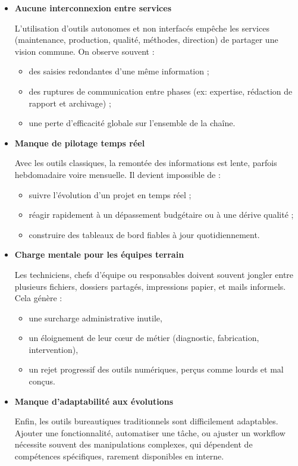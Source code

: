 \documentclass[11pt,a4paper]{article}
\begin{document}
\begin{itemize}
\item \textbf{Aucune interconnexion entre services}

L’utilisation d’outils autonomes et non interfacés empêche les services (maintenance, production, qualité, méthodes, direction) de partager une vision commune. On observe souvent :

\begin{itemize}
    \item des saisies redondantes d’une même information ;
    \item des ruptures de communication entre phases (ex: expertise, rédaction de rapport et archivage) ;
    \item une perte d’efficacité globale sur l’ensemble de la chaîne.
\end{itemize}

\item \textbf{Manque de pilotage temps réel}

Avec les outils classiques, la remontée des informations est lente, parfois hebdomadaire voire mensuelle. Il devient impossible de :

\begin{itemize}
    \item suivre l’évolution d’un projet en temps réel ;
    \item réagir rapidement à un dépassement budgétaire ou à une dérive qualité ;
    \item construire des tableaux de bord fiables à jour quotidiennement.
\end{itemize}

\item \textbf{Charge mentale pour les équipes terrain}

Les techniciens, chefs d’équipe ou responsables doivent souvent jongler entre plusieurs fichiers, dossiers partagés, impressions papier, et mails informels. Cela génère :

\begin{itemize}
    \item une surcharge administrative inutile,
    \item un éloignement de leur cœur de métier (diagnostic, fabrication, intervention),
    \item un rejet progressif des outils numériques, perçus comme lourds et mal conçus.
\end{itemize}

\item \textbf{Manque d’adaptabilité aux évolutions}

Enfin, les outils bureautiques traditionnels sont difficilement adaptables. Ajouter une fonctionnalité, automatiser une tâche, ou ajuster un workflow nécessite souvent des manipulations complexes, qui dépendent de compétences spécifiques, rarement disponibles en interne.

\end{itemize}
\end{document}
